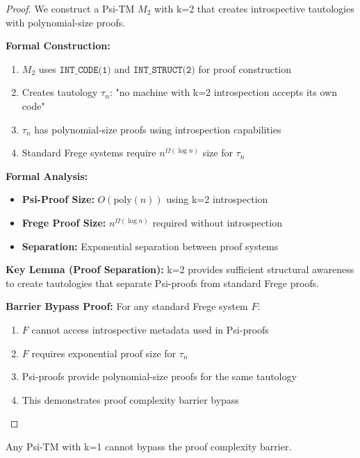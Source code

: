 \documentclass[11pt]{article}
\begin{document}
\begin{proof}
We construct a Psi-TM $M_2$ with k=2 that creates introspective tautologies with polynomial-size proofs.

\textbf{Formal Construction:}
\begin{enumerate}
\item $M_2$ uses $\texttt{INT\_CODE(1)}$ and $\texttt{INT\_STRUCT(2)}$ for proof construction
\item Creates tautology $\tau_n$: "no machine with k=2 introspection accepts its own code"
\item $\tau_n$ has polynomial-size proofs using introspection capabilities
\item Standard Frege systems require $n^{\Omega(\log n)}$ size for $\tau_n$
\end{enumerate}

\textbf{Formal Analysis:}
\begin{itemize}
\item \textbf{Psi-Proof Size:} $O(\text{poly}(n))$ using k=2 introspection
\item \textbf{Frege Proof Size:} $n^{\Omega(\log n)}$ required without introspection
\item \textbf{Separation:} Exponential separation between proof systems
\end{itemize}

\textbf{Key Lemma (Proof Separation):} k=2 provides sufficient structural awareness to create tautologies that separate Psi-proofs from standard Frege proofs.

\textbf{Barrier Bypass Proof:}
For any standard Frege system $F$:
\begin{enumerate}
\item $F$ cannot access introspective metadata used in Psi-proofs
\item $F$ requires exponential proof size for $\tau_n$
\item Psi-proofs provide polynomial-size proofs for the same tautology
\item This demonstrates proof complexity barrier bypass
\end{enumerate}
\end{proof}

\begin{theorem}
\label{thm:proof-complexity-k1}
Any Psi-TM with k=1 cannot bypass the proof complexity barrier.
\end{theorem}
\end{document}
